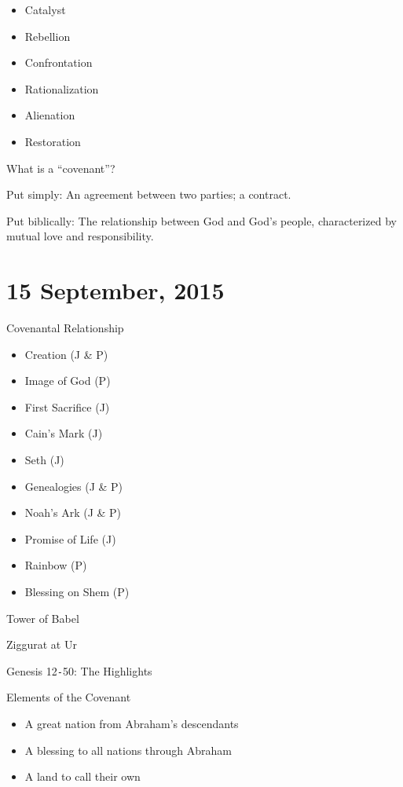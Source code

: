 \documentclass{article}
\begin{document}
    \begin{itemize}
        \item Catalyst
        \item Rebellion
        \item Confrontation
        \item Rationalization
        \item Alienation
        \item Restoration
    \end{itemize}

    What is a ``covenant''?

    Put simply: An agreement between two parties; a contract.

    Put biblically: The relationship between God and God's people, characterized by mutual love and responsibility.

\section{15 September, 2015}

    \centerline{Covenantal Relationship}

    \begin{itemize}
        \item Creation (J \& P)
        \item Image of God (P)
        \item First Sacrifice (J)
        \item Cain's Mark (J)
        \item Seth (J)
        \item Genealogies (J \& P)
        \item Noah's Ark (J \& P)
        \item Promise of Life (J)
        \item Rainbow (P)
        \item Blessing on Shem (P)
    \end{itemize}

    \centerline{Tower of Babel}

    Ziggurat at Ur

    \centerline{Genesis 12\texttt{-}50: The Highlights}

    Elements of the Covenant

    \begin{itemize}
        \item A great nation from Abraham's descendants
        \item A blessing to all nations through Abraham
        \item A land to call their own
    \end{itemize}
\end{document}
